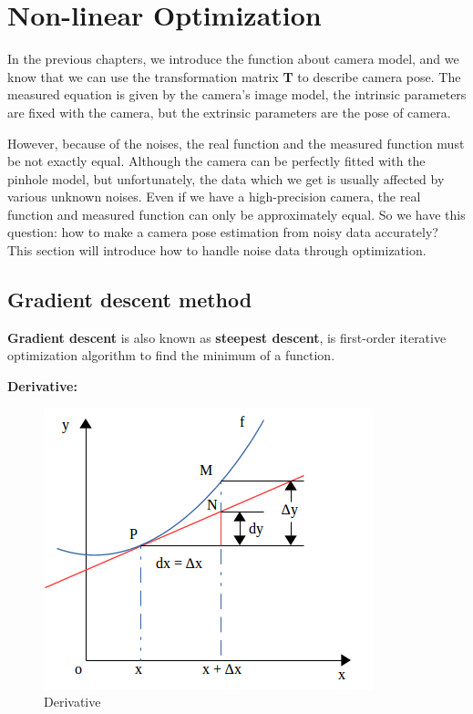 \chapter{Non-linear Optimization}
\label{chap:Non_linear_Optimization}

In the previous chapters, we introduce the function about camera model, and we know that we can use the transformation matrix \textbf{T} to describe camera pose. The measured equation is given by the camera's image model, the intrinsic parameters are fixed with the camera, but the extrinsic parameters are the pose of camera.

However, because of the noises, the real function and the measured function must be not exactly equal. Although the camera can be perfectly fitted with the pinhole model, but unfortunately, the data which we get is usually affected by various unknown noises. Even if we have a high-precision camera, the real function and measured function can only be approximately equal. So we have this question: how to make a camera pose estimation from noisy data accurately? This section will introduce how to handle noise data through optimization.

\section{Gradient descent method}

\textbf{Gradient descent} is also known as \textbf{steepest descent}, is first-order iterative optimization algorithm to find the minimum of a function.

\textbf{Derivative:}\\

\begin{figure}[h]
\centering
\includegraphics[scale=0.5]{./fig/derivative.png}
\caption{Derivative}
\label{fig:derivative}
\end{figure}


